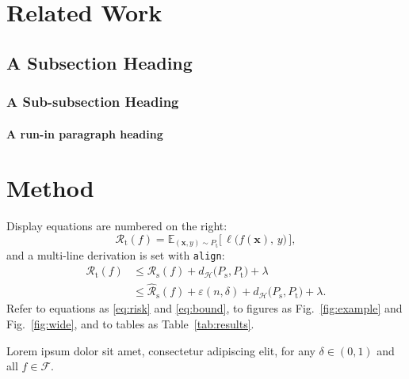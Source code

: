 \documentclass[review]{ml4d}
\newcommand{\vect}[1]{\mathbf{#1}}
\newcommand{\expect}{\mathbb{E}}
\begin{document}
\section{Related Work}
\lipsum[1]

\subsection{A Subsection Heading}
\lipsum[1]

\subsubsection{A Sub-subsection Heading}
\lipsum[1]

\paragraph{A run-in paragraph heading}
\lipsum[1]

\section{Method}
\lipsum[1]

Display equations are numbered on the right:
%
\begin{equation}
  \label{eq:risk}
  \mathcal{R}_{\mathrm{t}}(f)
    = \expect_{(\vect{x},y)\sim P_{\mathrm{t}}}
      \big[\,\ell\big(f(\vect{x}),\, y\big)\,\big],
\end{equation}
%
and a multi-line derivation is set with \texttt{align}:
%
\begin{align}
  \label{eq:bound}
  \mathcal{R}_{\mathrm{t}}(f)
    &\le \mathcal{R}_{\mathrm{s}}(f)
       + d_{\mathcal{H}}\big(P_{\mathrm{s}}, P_{\mathrm{t}}\big) + \lambda \\
    &\le \widehat{\mathcal{R}}_{\mathrm{s}}(f)
       + \varepsilon(n,\delta)
       + d_{\mathcal{H}}\big(P_{\mathrm{s}}, P_{\mathrm{t}}\big) + \lambda .
\end{align}
%
Refer to equations as \eqref{eq:risk} and \eqref{eq:bound}, to figures as
Fig.~\ref{fig:example} and Fig.~\ref{fig:wide}, and to tables as
Table~\ref{tab:results}.

\begin{theorem}[Informal]
\label{thm:example}
Lorem ipsum dolor sit amet, consectetur adipiscing elit, for any
$\delta \in (0,1)$ and all $f \in \mathcal{F}$.
\end{theorem}
\end{document}

